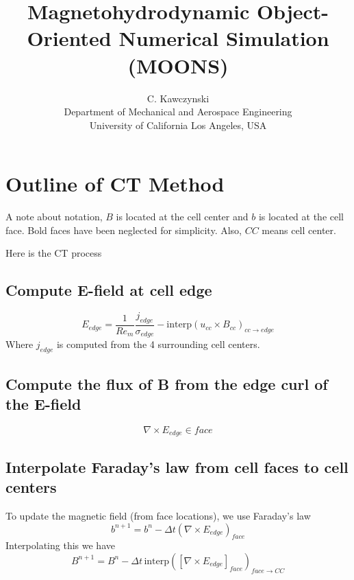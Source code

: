 \documentclass[11pt]{article}
\begin{document}
\doublespacing
\title{Magnetohydrodynamic Object-Oriented Numerical Simulation (MOONS)}
\author{C. Kawczynski \\
Department of Mechanical and Aerospace Engineering \\
University of California Los Angeles, USA\\
}
\maketitle

\section{Outline of CT Method}
A note about notation, $B$ is located at the cell center and $b$ is located at the cell face. Bold faces have been neglected for simplicity. Also, $CC$ means cell center.

Here is the CT process
\subsection{Compute E-field at cell edge}
\begin{equation}
	E_{edge} = \frac{1}{Re_m} \frac{j_{edge}}{\sigma_{edge}} - \text{interp}(u_{cc} \times B_{cc})_{cc \rightarrow edge}
\end{equation}
Where $j_{edge}$ is computed from the 4 surrounding cell centers.

\subsection{Compute the flux of B from the edge curl of the E-field}

\begin{equation}
	\nabla \times E_{edge} \in face
\end{equation}

\subsection{Interpolate Faraday's law from cell faces to cell centers}
To update the magnetic field (from face locations), we use Faraday's law
\begin{equation}
	b^{n+1} = b^{n} - \Delta t
	\left(
	\nabla \times E_{edge}
	\right)_{face}
\end{equation}
Interpolating this we have
\begin{equation}
	B^{n+1} = B^{n} - \Delta t \,
	\text{interp}(
	\left[
	\nabla \times E_{edge}
	\right]_{face}
	)_{face \rightarrow CC}
\end{equation}
\end{document}
